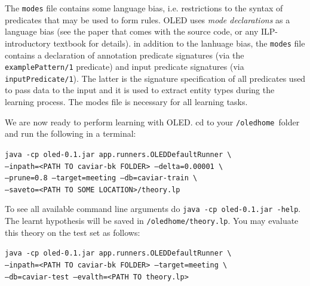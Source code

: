 \documentclass[12pt]{article}
\newcommand{\home}{\texttt{/oledhome}}
\begin{document}
The \texttt{modes} file contains some language bias, i.e. restrictions to the syntax of predicates that may be used to form rules. OLED uses \emph{mode declarations} as a language bias (see the paper that comes with the source code, or any ILP-introductory textbook for details). in addition to the lanhuage bias, the \texttt{modes} file contains a declaration of annotation predicate signatures (via the \texttt{examplePattern/1} predicate) and input predicate signatures (via \texttt{inputPredicate/1}). The latter is the signature specification of all predicates used to pass data to the input and it is used to extract entity types during the learning process. The modes file is necessary for all learning tasks.

We are now ready to perform learning with OLED. cd to your \home \ folder and run the following in a terminal:

\noindent \texttt{java -cp oled-0.1.jar app.runners.OLEDDefaultRunner \textbackslash}\\
\texttt{--inpath=<PATH TO caviar-bk FOLDER> --delta=0.00001 \textbackslash}   \\
\texttt{--prune=0.8 --target=meeting --db=caviar-train \textbackslash}\\
\texttt{--saveto=<PATH TO SOME LOCATION>/theory.lp}

To see all available command line arguments do \texttt{java -cp oled-0.1.jar -help}. The learnt hypothesis will be saved in \texttt{/oledhome/theory.lp}. You may evaluate this theory on the test set as follows: 

\noindent \texttt{java -cp oled-0.1.jar app.runners.OLEDDefaultRunner \textbackslash}\\
\texttt{--inpath=<PATH TO caviar-bk FOLDER> --target=meeting \textbackslash}   \\
\texttt{--db=caviar-test --evalth=<PATH TO theory.lp>}
\end{document}
